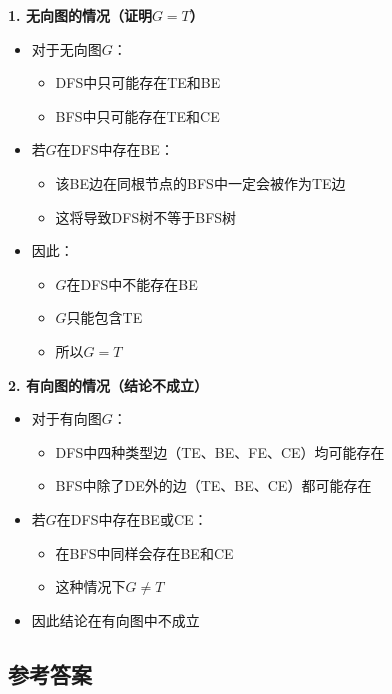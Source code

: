 \documentclass{article}
\begin{document}
\noindent\textbf{1. 无向图的情况（证明$G=T$）}
\begin{itemize}
    \item 对于无向图$G$：
    \begin{itemize}
        \item DFS中只可能存在TE和BE
        \item BFS中只可能存在TE和CE
    \end{itemize}
    
    \item 若$G$在DFS中存在BE：
    \begin{itemize}
        \item 该BE边在同根节点的BFS中一定会被作为TE边
        \item 这将导致DFS树不等于BFS树
    \end{itemize}
    
    \item 因此：
    \begin{itemize}
        \item $G$在DFS中不能存在BE
        \item $G$只能包含TE
        \item 所以$G = T$
    \end{itemize}
\end{itemize}

\noindent\textbf{2. 有向图的情况（结论不成立）}
\begin{itemize}
    \item 对于有向图$G$：
    \begin{itemize}
        \item DFS中四种类型边（TE、BE、FE、CE）均可能存在
        \item BFS中除了DE外的边（TE、BE、CE）都可能存在
    \end{itemize}
    
    \item 若$G$在DFS中存在BE或CE：
    \begin{itemize}
        \item 在BFS中同样会存在BE和CE
        \item 这种情况下$G \neq T$
    \end{itemize}
    
    \item 因此结论在有向图中不成立
\end{itemize}

\subsection{参考答案}
\end{document}
